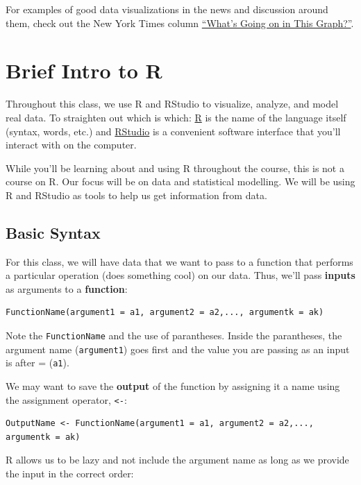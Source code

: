 \documentclass[]{book}
\begin{document}
For examples of good data visualizations in the news and discussion around them, check out the New York Times column \href{https://www.nytimes.com/column/whats-going-on-in-this-graph}{``What's Going on in This Graph?''}.

\hypertarget{brief-intro-to-r}{%
\section{Brief Intro to R}\label{brief-intro-to-r}}

Throughout this class, we use R and RStudio to visualize, analyze, and model real data. To straighten out which is which: \href{https://cran.r-project.org/}{R} is the name of the language itself (syntax, words, etc.) and \href{https://www.rstudio.com/}{RStudio} is a convenient software interface that you'll interact with on the computer.

While you'll be learning about and using R throughout the course, this is not a course on R. Our focus will be on data and statistical modelling. We will be using R and RStudio as tools to help us get information from data.

\hypertarget{basic-syntax}{%
\subsection{Basic Syntax}\label{basic-syntax}}

For this class, we will have data that we want to pass to a function that performs a particular operation (does something cool) on our data. Thus, we'll pass \textbf{inputs} as arguments to a \textbf{function}:

\begin{verbatim}
FunctionName(argument1 = a1, argument2 = a2,..., argumentk = ak)
\end{verbatim}

Note the \texttt{FunctionName} and the use of parantheses. Inside the parantheses, the argument name (\texttt{argument1}) goes first and the value you are passing as an input is after = (\texttt{a1}).

We may want to save the \textbf{output} of the function by assigning it a name using the assignment operator, \texttt{\textless{}-}:

\begin{verbatim}
OutputName <- FunctionName(argument1 = a1, argument2 = a2,..., argumentk = ak)
\end{verbatim}

R allows us to be lazy and not include the argument name as long as we provide the input in the correct order:
\end{document}
